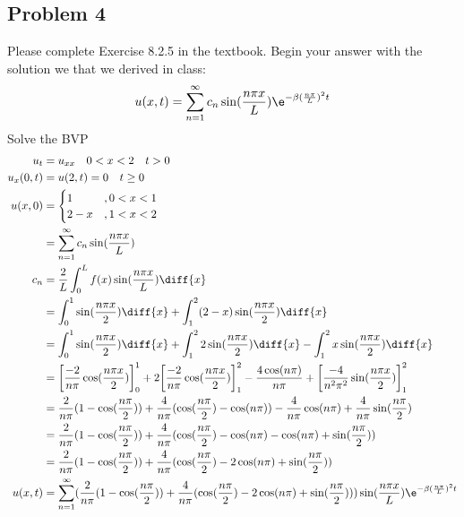 \documentclass{math}
\begin{document}
\subsection*{Problem 4}
Please complete Exercise 8.2.5 in the textbook. Begin your answer with the
solution we that we derived in class:
\[ u(x,t) = \sum_{n=1}^{\infty}
  c_n\sin(\frac{n\pi x}{L})\e^{-\beta(\frac{n\pi}{L})^2t} \]
Solve the BVP
\begin{align*}
  u_t &= u_{xx} \quad 0<x<2 \quad t>0 \\
  u_x(0,t) &= u(2,t) = 0 \quad t\ge0 \\
  u(x,0) &= \begin{cases}
    1 &, 0<x<1 \\
    2-x &, 1<x<2
  \end{cases} \\
  &= \sum_{n=1}^{\infty}c_n\sin(\frac{n\pi x}{L}) \\
  c_n &= \frac{2}{L}\int_{0}^{L}f(x)\sin(\frac{n\pi x}{L})\diff{x} \\
  &= \int_{0}^{1}\sin(\frac{n\pi x}{2})\diff{x}+
    \int_{1}^{2}(2-x)\sin(\frac{n\pi x}{2})\diff{x} \\
  &= \int_{0}^{1}\sin(\frac{n\pi x}{2})\diff{x}+
    \int_{1}^{2}2\sin(\frac{n\pi x}{2})\diff{x}-
    \int_{1}^{2}x\sin(\frac{n\pi x}{2})\diff{x} \\
  &= \bigg[\frac{-2}{n\pi}\cos(\frac{n\pi x}{2})\bigg]_{0}^{1}+
    2\bigg[\frac{-2}{n\pi}\cos(\frac{n\pi x}{2})\bigg]_{1}^{2}-
    \frac{4\cos(n\pi)}{n\pi}+
    \bigg[\frac{-4}{n^2\pi^2}\sin(\frac{n\pi x}{2})\bigg]_{1}^{2} \\
  &= \frac{2}{n\pi}(1-\cos(\frac{n\pi}{2}))+
    \frac{4}{n\pi}(\cos(\frac{n\pi}{2})-\cos(n\pi))-
    \frac{4}{n\pi}\cos(n\pi)+
    \frac{4}{n\pi}\sin(\frac{n\pi}{2}) \\
  &= \frac{2}{n\pi}(1-\cos(\frac{n\pi}{2}))+
    \frac{4}{n\pi}(\cos(\frac{n\pi}{2})-\cos(n\pi)-\cos(n\pi)+
    \sin(\frac{n\pi}{2})) \\
  &= \frac{2}{n\pi}(1-\cos(\frac{n\pi}{2}))+
    \frac{4}{n\pi}(\cos(\frac{n\pi}{2})-2\cos(n\pi)+\sin(\frac{n\pi}{2})) \\
  u(x,t) &= \sum_{n=1}^{\infty}(\frac{2}{n\pi}(1-\cos(\frac{n\pi}{2}))+
    \frac{4}{n\pi}(\cos(\frac{n\pi}{2})-2\cos(n\pi)+\sin(\frac{n\pi}{2})))
    \sin(\frac{n\pi x}{L})\e^{-\beta(\frac{n\pi}{L})^2t}
\end{align*}
\end{document}
